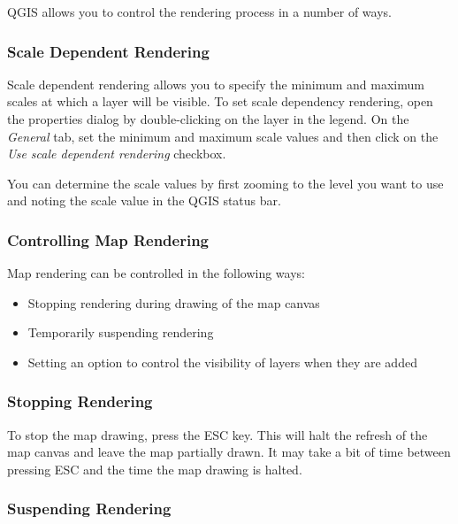 QGIS allows you to control the rendering process in a number of ways.

\subsubsection{Scale Dependent Rendering}
\label{label_scaledepend}

Scale dependent rendering allows you to specify the minimum and maximum
scales at which a layer will be visible.  To set scale dependency rendering,
open the properties dialog by double-clicking on the layer in the legend. On
the \textit{General} tab, set the minimum and maximum scale values and then
click on the \textit{Use scale dependent rendering} checkbox.

You can determine the scale values by first zooming to the level you want
to use and noting the scale value in the QGIS status bar.

\subsubsection{Controlling Map Rendering}\label{label_controlmap}


Map rendering can be controlled in the following ways:

\begin{itemize}
\item Stopping rendering during drawing of the map canvas
\item Temporarily suspending rendering
\item Setting an option to control the visibility of layers when they are
added
\end{itemize}

\subsubsection{Stopping Rendering}
\label{label_stoprender}

To stop the map drawing, press the ESC key. This will halt the refresh of
the map canvas and leave the map partially drawn. It may take a bit of time
between pressing ESC and the time the map drawing is halted.

\subsubsection{Suspending Rendering}
\label{label_suspendrender}

